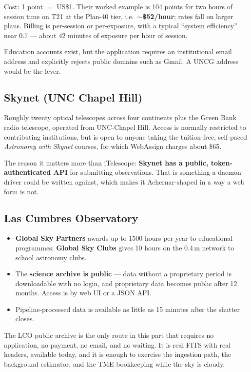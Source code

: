 \documentclass[11pt]{article}
\begin{document}
Cost: 1 point $=$ US\$1. Their worked example is 104 points for two hours of
session time on T21 at the Plan-40 tier, i.e.\ \textbf{$\sim$\$52/hour};
rates fall on larger plans. Billing is per-session or per-exposure, with a
typical ``system efficiency'' near 0.7 --- about 42 minutes of exposure per hour
of session.

Education accounts exist, but the application requires an institutional email
address and explicitly rejects public domains such as Gmail. A UNCG address
would be the lever.

\subsection{Skynet (UNC Chapel Hill)}

Roughly twenty optical telescopes across four continents plus the Green Bank
radio telescope, operated from UNC-Chapel Hill. Access is normally restricted to
contributing institutions, but is open to anyone taking the tuition-free,
self-paced \emph{Astronomy with Skynet} courses, for which WebAssign charges
about \$65.

The reason it matters more than iTelescope: \textbf{Skynet has a public,
token-authenticated API} for submitting observations. That is something a daemon
driver could be written against, which makes it Achernar-shaped in a way a web
form is not.

\subsection{Las Cumbres Observatory}

\begin{itemize}
\item \textbf{Global Sky Partners} awards up to 1500 hours per year to
      educational programmes; \textbf{Global Sky Clubs} gives 10 hours on the
      0.4\,m network to school astronomy clubs.
\item The \textbf{science archive is public} --- data without a proprietary
      period is downloadable with no login, and proprietary data becomes public
      after 12 months. Access is by web UI or a JSON API.
\item Pipeline-processed data is available as little as 15 minutes after the
      shutter closes.
\end{itemize}

\begin{okbox}
The LCO public archive is the only route in this part that requires no
application, no payment, no email, and no waiting. It is real FITS with real
headers, available today, and it is enough to exercise the ingestion path, the
background estimator, and the TME bookkeeping while the sky is cloudy.
\end{okbox}
\end{document}

